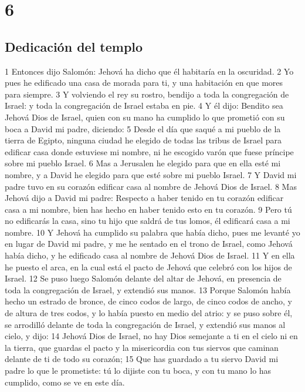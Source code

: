 \chapter{6}

\section*{Dedicación del templo}



1 Entonces dijo Salomón: Jehová ha dicho que él habitaría en la oscuridad.
2 Yo pues he edificado una casa de morada para ti, y una habitación en que mores para siempre.
3 Y volviendo el rey su rostro, bendijo  a  toda la congregación de Israel: y toda la congregación de Israel estaba en pie.
4 Y él dijo: Bendito sea Jehová Dios de Israel, quien con su mano ha cumplido lo que prometió con su boca  a  David mi padre, diciendo:
5 Desde el día que saqué a mi pueblo de la tierra de Egipto, ninguna ciudad he elegido de todas las tribus de Israel para edificar casa donde estuviese mi nombre, ni he escogido varón que fuese príncipe sobre mi pueblo Israel.
6 Mas  a  Jerusalen he elegido para que en ella esté mi nombre, y  a  David he elegido para que esté sobre mi pueblo Israel.
7 Y David mi padre tuvo en su corazón edificar casa al nombre de Jehová Dios de Israel.
8 Mas Jehová dijo  a  David mi padre: Respecto  a  haber tenido en tu corazón edificar casa  a  mi nombre, bien has hecho en haber tenido esto en tu corazón.
9 Pero tú no edificarás la casa, sino tu hijo que saldrá de tus lomos, él edificará casa  a  mi nombre. 
10 Y Jehová ha cumplido su palabra que había dicho, pues me levanté yo en lugar de David mi padre, y me he sentado en el trono de Israel, como Jehová había dicho, y he edificado casa al nombre de Jehová Dios de Israel.
11 Y en ella he puesto el arca, en la cual está el pacto de Jehová que celebró con los hijos de Israel.
12 Se puso luego Salomón delante del altar de Jehová, en presencia de toda la congregación de Israel, y extendió sus manos.
13 Porque Salomón había hecho un estrado de bronce, de cinco codos   de largo, de cinco codos de ancho, y de altura de tres codos, y lo había puesto en medio del atrio: y se puso sobre él, se arrodilló delante de toda la congregación de Israel, y extendió sus manos al cielo, y dijo:
14 Jehová Dios de Israel, no hay Dios semejante  a  ti en el cielo ni en la tierra, que guardas el pacto y la misericordia con tus siervos que caminan delante de ti de todo su corazón;
15 Que has guardado  a  tu siervo David mi padre lo que le prometiste: tú lo dijiste con tu boca, y con tu mano lo has cumplido, como se ve en este día.
